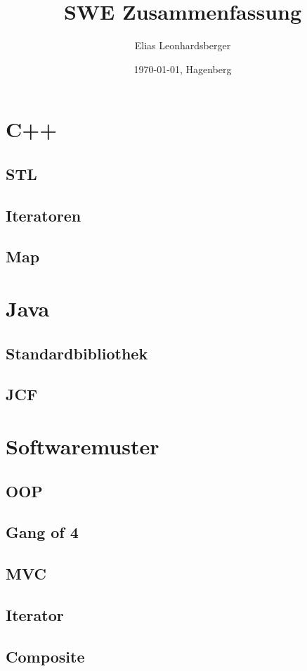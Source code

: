 \documentclass[12pt]{scrartcl}
\title{SWE Zusammenfassung}
\author{Elias Leonhardsberger}
\date{\today{}, Hagenberg}
\begin{document}
\maketitle
\tableofcontents

\pagebreak

\section{C++}
\subsection{STL}
\subsection{Iteratoren}
\subsection{Map}
\section{Java}
\subsection{Standardbibliothek}
\subsection{JCF}
\section{Softwaremuster}
\subsection{OOP}
\subsection{Gang of 4}
\subsection{MVC}
\subsection{Iterator}
\subsection{Composite}
\end{document}
